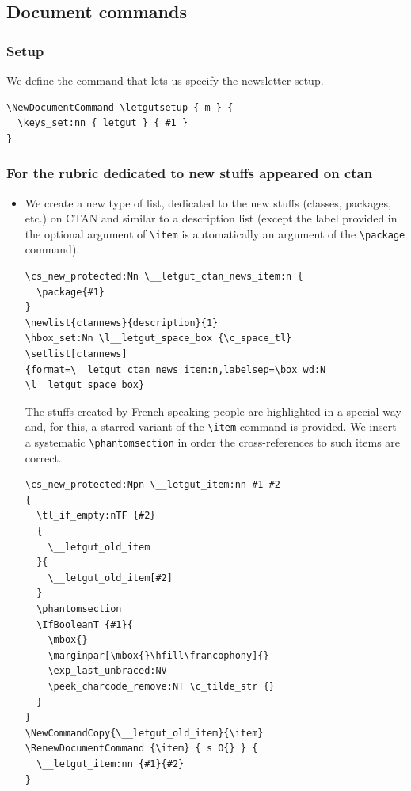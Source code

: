 \documentclass{letgut}
\begin{document}
\subsection{Document commands}
\label{ImplementationDocumentcommands-s1qg55h0jlj0}
\subsubsection{Setup}
\label{ImplementationDocumentcommandsSetup-roqg55h0jlj0}
We define the command that lets us specify the newsletter setup.

\begin{lstlisting}
\NewDocumentCommand \letgutsetup { m } {
  \keys_set:nn { letgut } { #1 }
}
\end{lstlisting}
\subsubsection{For the rubric dedicated to new stuffs appeared on \acs{ctan}}
\label{ImplementationDocumentcommandsFortherubricdedicatedtonewstuffsappearedonacsctan-jerg55h0jlj0}
\begin{itemize}
\item We create a new type of list, dedicated to the new stuffs (classes, packages,
etc.) on CTAN and similar to a description list (except the label provided in
the optional argument of \lstinline+\item+ is automatically an argument of the
\lstinline+\package+ command).
\begin{lstlisting}
\cs_new_protected:Nn \__letgut_ctan_news_item:n {
  \package{#1}
}
\newlist{ctannews}{description}{1}
\hbox_set:Nn \l__letgut_space_box {\c_space_tl}
\setlist[ctannews]{format=\__letgut_ctan_news_item:n,labelsep=\box_wd:N \l__letgut_space_box}
\end{lstlisting}
The stuffs created by French speaking people are highlighted in a special
way and, for this, a starred variant of the \lstinline+\item+ command is provided. We
insert a systematic \lstinline+\phantomsection+ in order the cross-references to such
items are correct.
\begin{lstlisting}
\cs_new_protected:Npn \__letgut_item:nn #1 #2
{
  \tl_if_empty:nTF {#2}
  {
    \__letgut_old_item
  }{
    \__letgut_old_item[#2]
  }
  \phantomsection
  \IfBooleanT {#1}{
    \mbox{}
    \marginpar[\mbox{}\hfill\francophony]{}
    \exp_last_unbraced:NV
    \peek_charcode_remove:NT \c_tilde_str {}
  }
}
\NewCommandCopy{\__letgut_old_item}{\item}
\RenewDocumentCommand {\item} { s O{} } {
  \__letgut_item:nn {#1}{#2}
}
\end{lstlisting}
\end{itemize}
\end{document}
